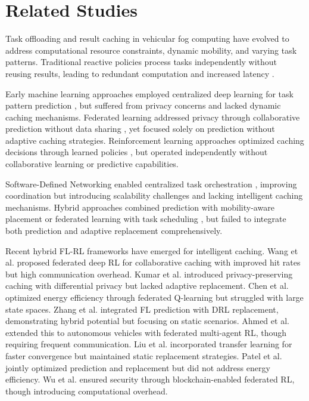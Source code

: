 \section{Related Studies}

\noindent Task offloading and result caching in vehicular fog computing have evolved to address computational resource constraints, dynamic mobility, and varying task patterns. Traditional reactive policies process tasks independently without reusing results, leading to redundant computation and increased latency \cite{zhang2018caching}.

Early machine learning approaches employed centralized deep learning for task pattern prediction \cite{chen2019deep}, but suffered from privacy concerns and lacked dynamic caching mechanisms. Federated learning addressed privacy through collaborative prediction without data sharing \cite{liu2020federated,lim2020federated}, yet focused solely on prediction without adaptive caching strategies. Reinforcement learning approaches optimized caching decisions through learned policies \cite{sadeghi2019deep,wang2020reinforcement,li2024adaptive}, but operated independently without collaborative learning or predictive capabilities.

Software-Defined Networking enabled centralized task orchestration \cite{xu2018software,zhang2019sdn,zhao2024distributed}, improving coordination but introducing scalability challenges and lacking intelligent caching mechanisms. Hybrid approaches combined prediction with mobility-aware placement \cite{li2020hybrid} or federated learning with task scheduling \cite{he2021intelligent}, but failed to integrate both prediction and adaptive replacement comprehensively.

Recent hybrid FL-RL frameworks have emerged for intelligent caching. Wang et al. \cite{wang2024federated} proposed federated deep RL for collaborative caching with improved hit rates but high communication overhead. Kumar et al. \cite{kumar2024privacy} introduced privacy-preserving caching with differential privacy but lacked adaptive replacement. Chen et al. \cite{chen2024energy} optimized energy efficiency through federated Q-learning but struggled with large state spaces. Zhang et al. \cite{zhang2025intelligent} integrated FL prediction with DRL replacement, demonstrating hybrid potential but focusing on static scenarios. Ahmed et al. \cite{ahmed2025collaborative} extended this to autonomous vehicles with federated multi-agent RL, though requiring frequent communication. Liu et al. \cite{liu2025predictive} incorporated transfer learning for faster convergence but maintained static replacement strategies. Patel et al. \cite{patel2025dynamic} jointly optimized prediction and replacement but did not address energy efficiency. Wu et al. \cite{wu2025secure} ensured security through blockchain-enabled federated RL, though introducing computational overhead.

